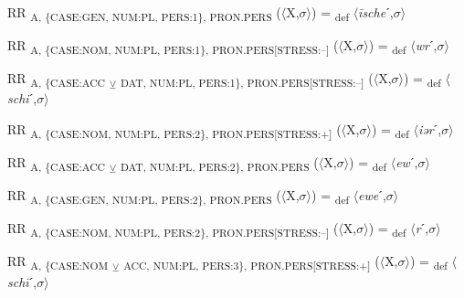 {\begin{exe}
 RR \textsubscript{A, \{CASE:GEN, NUM:PL, PERS:1\}, PRON.PERS} ($\langle$X,$\sigma $$\rangle$) = \textsubscript{def} $\langle$\textit{\=ische}ˊ,$\sigma $$\rangle$
\end{exe}

\begin{exe}
 RR \textsubscript{A, \{CASE:NOM, NUM:PL, PERS:1\}, PRON.PERS[STRESS:–]} ($\langle$X,$\sigma $$\rangle$) = \textsubscript{def} $\langle$\textit{wr}ˊ,$\sigma $$\rangle$
\end{exe}

\begin{exe}
 RR \textsubscript{A, \{CASE:ACC} \textsubscript{${\veebar}$}\textsubscript{ DAT, NUM:PL, PERS:1\}, PRON.PERS[STRESS:–]} ($\langle$X,$\sigma $$\rangle$) = \textsubscript{def} $\langle$\textit{schi}ˊ,$\sigma $$\rangle$
\end{exe}

\begin{exe}
 RR \textsubscript{A, \{CASE:NOM, NUM:PL, PERS:2\}, PRON.PERS[STRESS:+]} ($\langle$X,$\sigma $$\rangle$) = \textsubscript{def} $\langle$\textit{iər}ˊ,$\sigma $$\rangle$
\end{exe}

\begin{exe}
 RR \textsubscript{A, \{CASE:ACC} \textsubscript{${\veebar}$}\textsubscript{ DAT, NUM:PL, PERS:2\}, PRON.PERS} ($\langle$X,$\sigma $$\rangle$) = \textsubscript{def} $\langle$\textit{ew}ˊ,$\sigma $$\rangle$
\end{exe}

\begin{exe}
 RR \textsubscript{A, \{CASE:GEN, NUM:PL, PERS:2\}, PRON.PERS} ($\langle$X,$\sigma $$\rangle$) = \textsubscript{def} $\langle$\textit{ewe}ˊ,$\sigma $$\rangle$
\end{exe}

\begin{exe}
 RR \textsubscript{A, \{CASE:NOM, NUM:PL, PERS:2\}, PRON.PERS[STRESS:–]} ($\langle$X,$\sigma $$\rangle$) = \textsubscript{def} $\langle$\textit{r}ˊ,$\sigma $$\rangle$
\end{exe}

\begin{exe}
 RR \textsubscript{A, \{CASE:NOM} \textsubscript{${\veebar}$}\textsubscript{ ACC, NUM:PL, PERS:3\}, PRON.PERS[STRESS:+]} ($\langle$X,$\sigma $$\rangle$) = \textsubscript{def} $\langle$\textit{sch\=i}ˊ,$\sigma $$\rangle$
\end{exe}

}
